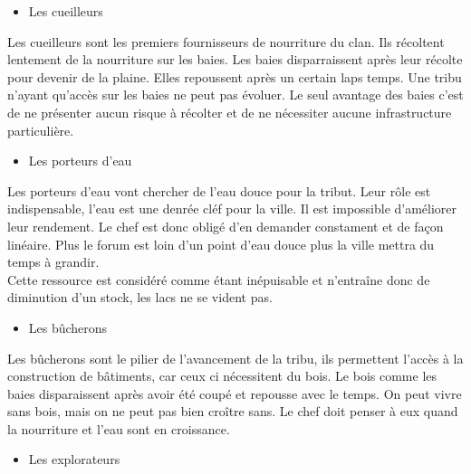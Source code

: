 \documentclass[12pt]{article}
\begin{document}
		\begin{itemize}
		\item Les cueilleurs\\
		\end{itemize}
		
Les cueilleurs sont les premiers fournisseurs de nourriture du clan. Ils 
récoltent lentement de la nourriture sur les baies. Les baies disparraissent 
après leur récolte pour devenir de la plaine. Elles repoussent après un 
certain laps temps. Une tribu n'ayant qu'accès sur les baies ne peut pas 
évoluer. Le seul avantage des baies c'est de ne présenter aucun risque à 
récolter et de ne nécessiter aucune infrastructure particulière.\\ 

		\begin{itemize}
		\item Les porteurs d'eau\\
		\end{itemize}
		
Les porteurs d'eau vont chercher de l'eau douce pour la tribut. Leur rôle est 
indispensable, l'eau est une denrée cléf pour la ville. Il est impossible 
d'améliorer leur rendement. Le chef est donc obligé d'en demander constament 
et de façon linéaire. Plus le forum est loin d'un point d'eau douce plus la 
ville mettra du temps à grandir.\\

Cette ressource est considéré comme étant inépuisable et n'entraîne donc de 
diminution d'un stock, les lacs ne se vident pas.\\

		\begin{itemize}
		\item Les bûcherons\\
		\end{itemize}

Les bûcherons sont le pilier de l'avancement de la tribu, ils permettent  
l'accès à la construction de bâtiments, car ceux ci nécessitent du bois. Le 
bois comme les baies disparaissent après avoir été coupé et repousse avec le 
temps. On peut vivre sans bois, mais on ne peut pas bien croître sans. Le chef 
doit penser à eux quand la nourriture et l'eau sont en croissance.\\

		\begin{itemize}
		\item Les explorateurs\\
		\end{itemize}
		
\end{document}
